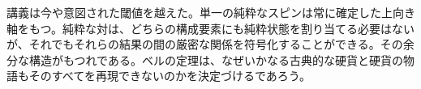 \begin{classroomqa}
\end{classroomqa}

講義は今や意図された閾値を越えた。単一の純粋なスピンは常に確定した上向き軸をもつ。純粋な対は、どちらの構成要素にも純粋状態を割り当てる必要はないが、それでもそれらの結果の間の厳密な関係を符号化することができる。その余分な構造がもつれである。ベルの定理は、なぜいかなる古典的な硬貨と硬貨の物語もそのすべてを再現できないのかを決定づけるであろう。
